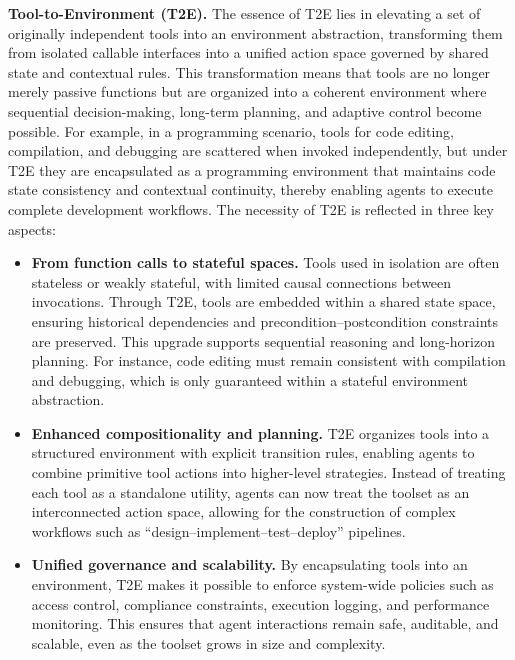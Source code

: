 \documentclass[11pt]{article}
\begin{document}
\textbf{Tool-to-Environment (T2E).} The essence of T2E lies in elevating a set of originally independent tools into an environment abstraction, transforming them from isolated callable interfaces into a unified action space governed by shared state and contextual rules. This transformation means that tools are no longer merely passive functions but are organized into a coherent environment where sequential decision-making, long-term planning, and adaptive control become possible. For example, in a programming scenario, tools for code editing, compilation, and debugging are scattered when invoked independently, but under T2E they are encapsulated as a programming environment that maintains code state consistency and contextual continuity, thereby enabling agents to execute complete development workflows. The necessity of T2E is reflected in three key aspects:  
\begin{itemize}[leftmargin=*,itemsep=0.1em]
  \item \textbf{From function calls to stateful spaces.} Tools used in isolation are often stateless or weakly stateful, with limited causal connections between invocations. Through T2E, tools are embedded within a shared state space, ensuring historical dependencies and precondition–postcondition constraints are preserved. This upgrade supports sequential reasoning and long-horizon planning. For instance, code editing must remain consistent with compilation and debugging, which is only guaranteed within a stateful environment abstraction.  

  \item \textbf{Enhanced compositionality and planning.} T2E organizes tools into a structured environment with explicit transition rules, enabling agents to combine primitive tool actions into higher-level strategies. Instead of treating each tool as a standalone utility, agents can now treat the toolset as an interconnected action space, allowing for the construction of complex workflows such as “design–implement–test–deploy” pipelines.  

  \item \textbf{Unified governance and scalability.} By encapsulating tools into an environment, T2E makes it possible to enforce system-wide policies such as access control, compliance constraints, execution logging, and performance monitoring. This ensures that agent interactions remain safe, auditable, and scalable, even as the toolset grows in size and complexity.  
\end{itemize}
\end{document}
